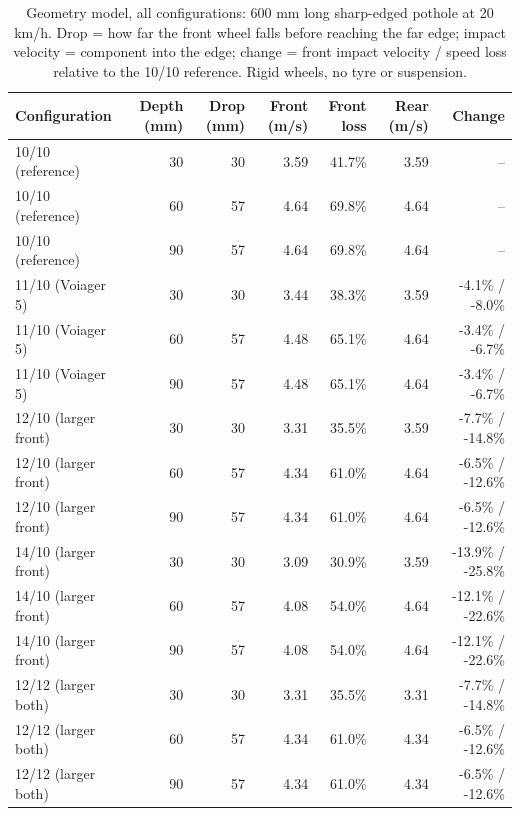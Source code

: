 \begin{table}[htbp]
\centering\small
\caption{Geometry model, all configurations: 600 mm long sharp-edged pothole at 20 km/h. Drop = how far the front wheel falls before reaching the far edge; impact velocity = component into the edge; change = front impact velocity / speed loss relative to the 10/10 reference. Rigid wheels, no tyre or suspension.}\label{tab:Egeom}
\begin{tabular}{@{}lrrrrrr@{}}
\toprule
Configuration & Depth (mm) & Drop (mm) & Front (m/s) & Front loss & Rear (m/s) & Change \\
\midrule
10/10 (reference) & 30 & 30 & 3.59 & 41.7\% & 3.59 & -- \\
10/10 (reference) & 60 & 57 & 4.64 & 69.8\% & 4.64 & -- \\
10/10 (reference) & 90 & 57 & 4.64 & 69.8\% & 4.64 & -- \\
11/10 (Voiager 5) & 30 & 30 & 3.44 & 38.3\% & 3.59 & -4.1\% / -8.0\% \\
11/10 (Voiager 5) & 60 & 57 & 4.48 & 65.1\% & 4.64 & -3.4\% / -6.7\% \\
11/10 (Voiager 5) & 90 & 57 & 4.48 & 65.1\% & 4.64 & -3.4\% / -6.7\% \\
12/10 (larger front) & 30 & 30 & 3.31 & 35.5\% & 3.59 & -7.7\% / -14.8\% \\
12/10 (larger front) & 60 & 57 & 4.34 & 61.0\% & 4.64 & -6.5\% / -12.6\% \\
12/10 (larger front) & 90 & 57 & 4.34 & 61.0\% & 4.64 & -6.5\% / -12.6\% \\
14/10 (larger front) & 30 & 30 & 3.09 & 30.9\% & 3.59 & -13.9\% / -25.8\% \\
14/10 (larger front) & 60 & 57 & 4.08 & 54.0\% & 4.64 & -12.1\% / -22.6\% \\
14/10 (larger front) & 90 & 57 & 4.08 & 54.0\% & 4.64 & -12.1\% / -22.6\% \\
12/12 (larger both) & 30 & 30 & 3.31 & 35.5\% & 3.31 & -7.7\% / -14.8\% \\
12/12 (larger both) & 60 & 57 & 4.34 & 61.0\% & 4.34 & -6.5\% / -12.6\% \\
12/12 (larger both) & 90 & 57 & 4.34 & 61.0\% & 4.34 & -6.5\% / -12.6\% \\
\bottomrule
\end{tabular}
\end{table}

